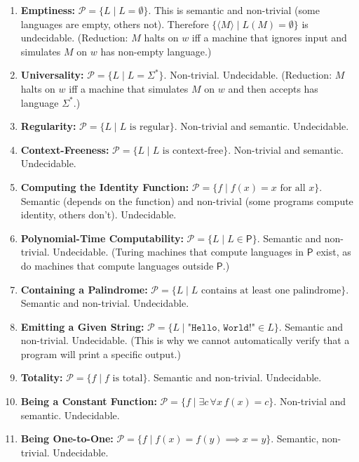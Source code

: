 \begin{enumerate}
\item \textbf{Emptiness:} $\mathcal{P} = \{ L \mid L = \emptyset \}$. This is semantic and non-trivial (some languages are empty, others not). Therefore $\{ \langle M \rangle \mid L(M) = \emptyset \}$ is undecidable. (Reduction: $M$ halts on $w$ iff a machine that ignores input and simulates $M$ on $w$ has non-empty language.)

\item \textbf{Universality:} $\mathcal{P} = \{ L \mid L = \Sigma^* \}$. Non-trivial. Undecidable. (Reduction: $M$ halts on $w$ iff a machine that simulates $M$ on $w$ and then accepts has language $\Sigma^*$.)

\item \textbf{Regularity:} $\mathcal{P} = \{ L \mid L \text{ is regular} \}$. Non-trivial and semantic. Undecidable.

\item \textbf{Context-Freeness:} $\mathcal{P} = \{ L \mid L \text{ is context-free} \}$. Non-trivial and semantic. Undecidable.

\item \textbf{Computing the Identity Function:} $\mathcal{P} = \{ f \mid f(x) = x \text{ for all } x \}$. Semantic (depends on the function) and non-trivial (some programs compute identity, others don't). Undecidable.

\item \textbf{Polynomial-Time Computability:} $\mathcal{P} = \{ L \mid L \in \mathsf{P} \}$. Semantic and non-trivial. Undecidable. (Turing machines that compute languages in $\mathsf{P}$ exist, as do machines that compute languages outside $\mathsf{P}$.)

\item \textbf{Containing a Palindrome:} $\mathcal{P} = \{ L \mid L \text{ contains at least one palindrome} \}$. Semantic and non-trivial. Undecidable.

\item \textbf{Emitting a Given String:} $\mathcal{P} = \{ L \mid \texttt{"Hello, World!"} \in L \}$. Semantic and non-trivial. Undecidable. (This is why we cannot automatically verify that a program will print a specific output.)

\item \textbf{Totality:} $\mathcal{P} = \{ f \mid f \text{ is total} \}$. Semantic and non-trivial. Undecidable.

\item \textbf{Being a Constant Function:} $\mathcal{P} = \{ f \mid \exists c \, \forall x \, f(x) = c \}$. Non-trivial and semantic. Undecidable.

\item \textbf{Being One-to-One:} $\mathcal{P} = \{ f \mid f(x) = f(y) \implies x = y \}$. Semantic, non-trivial. Undecidable.
\end{enumerate}

